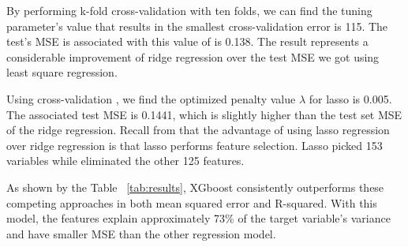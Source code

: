 By performing k-fold cross-validation with ten folds, we can find the tuning
parameter's value that results in the smallest cross-validation error is 115.
The test's MSE is associated with this value of  is 0.138.  The result
represents a considerable improvement of ridge regression over the test MSE we
got using least square regression.


Using cross-validation , we find the optimized penalty value $\lambda$ for lasso
is 0.005.  The associated test MSE is 0.1441, which is slightly higher than the
test set MSE of the ridge regression.  Recall from that the advantage of using
lasso regression over ridge regression is that lasso performs feature selection.
Lasso picked 153 variables while eliminated the other 125 features.





As shown by the Table ~\ref{tab:results}, XGboost consistently outperforms these
competing approaches in both mean squared error and R-squared.  With this model,
the features explain approximately 73\% of the target variable's variance and
have smaller MSE than the other regression model.

